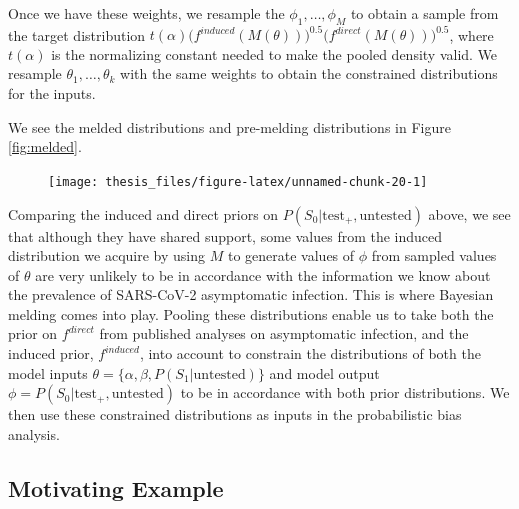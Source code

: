 \documentclass[12pt,twoside]{smiththesis}
\begin{document}
Once we have these weights, we resample the \(\phi_1,\dots,\phi_M\) to obtain a sample from the target distribution \(t(\alpha) \Big( f^{induced}(M(\theta)) \Big)^{0.5} \Big( f^{direct} (M(\theta)) \Big)^{0.5}\), where \(t(\alpha)\) is the normalizing constant needed to make the pooled density valid. We resample \(\theta_1, \dots, \theta_k\) with the same weights to obtain the constrained distributions for the inputs.

We see the melded distributions and pre-melding distributions in Figure \ref{fig:melded}.
\begin{figure}

{\centering \texttt{[image: thesis\_files/figure-latex/unnamed-chunk-20-1]} 

}

\caption{\label{fig:melded}}\label{fig:unnamed-chunk-20}
\end{figure}
Comparing the induced and direct priors on \(P(S_0| \text{test}_+, \text{untested})\) above, we see that although they have shared support, some values from the induced distribution we acquire by using \(M\) to generate values of \(\phi\) from sampled values of \(\theta\) are very unlikely to be in accordance with the information we know about the prevalence of SARS-CoV-2 asymptomatic infection. This is where Bayesian melding comes into play. Pooling these distributions enable us to take both the prior on \(f^{direct}\) from published analyses on asymptomatic infection, and the induced prior, \(f^{induced}\), into account to constrain the distributions of both the model inputs \(\theta = \{ \alpha, \beta, P(S_1 | \text{untested})\}\) and model output \(\phi = P(S_0|\text{test}_+, \text{untested})\) to be in accordance with both prior distributions. We then use these constrained distributions as inputs in the probabilistic bias analysis.

\hypertarget{motivating-example}{%
\subsection{Motivating Example}\label{motivating-example}}
\end{document}
